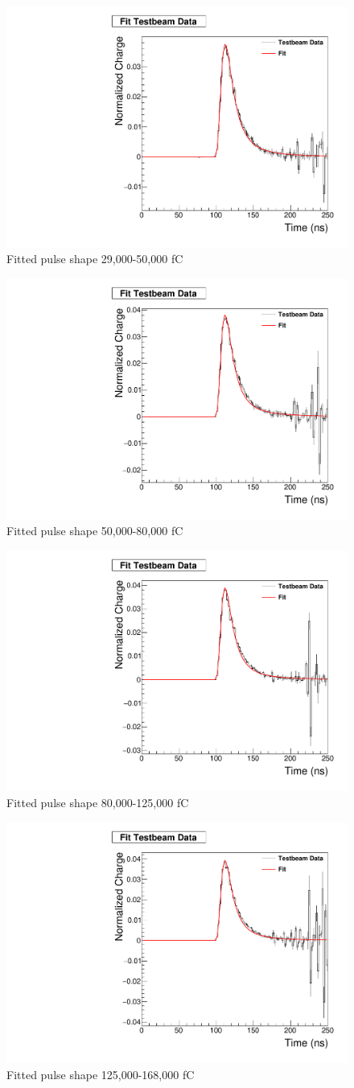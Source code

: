 \begin{figure}
\centering
\includegraphics[width=0.5\linewidth]{Figures/29FittedPlot.pdf}
\caption{Fitted pulse shape 29,000-50,000 fC}
\label{fig:29fit}
\end{figure}

\begin{figure}
\centering
\includegraphics[width=0.5\linewidth]{Figures/50FittedPlot.pdf}
\caption{Fitted pulse shape 50,000-80,000 fC}
\label{fig:50fit}
\end{figure}

\begin{figure}
\centering
\includegraphics[width=0.5\linewidth]{Figures/80FittedPlot.pdf}
\caption{Fitted pulse shape 80,000-125,000 fC}
\label{fig:80fit}
\end{figure}

\begin{figure}
\centering
\includegraphics[width=0.5\linewidth]{Figures/125FittedPlot.pdf}
\caption{Fitted pulse shape 125,000-168,000 fC}
\label{fig:125fit}
\end{figure}

